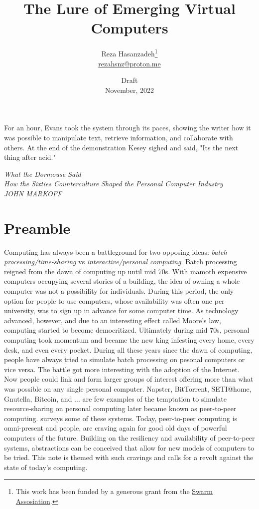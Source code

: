 \documentclass[a4paper, 10pt]{article}
\title{The Lure of Emerging Virtual Computers}
\author{Reza Hasanzadeh\thanks{This work has been funded by a generous grant from the \href{https://my.ethswarm.org/grants}{Swarm Assosiation}.}  \\ \href{mailto:rezahsnz@proton.me}{\small{rezahsnz@proton.me}}}
\date{\footnotesize{Draft} \\ \footnotesize{November, 2022}}
\begin{document}

\maketitle

\epigraph{For an hour, Evans took the system through its paces, showing the writer
how it was possible to manipulate text, retrieve information, and
collaborate with others. At the end of the demonstration Kesey sighed and
said, "Its the next thing after acid."}{\textit{What the Dormouse Said} \\ \textit{How the Sixties Counterculture Shaped the Personal Computer Industry} \\ \textit{JOHN MARKOFF}}

\section{Preamble}
Computing has always been a battleground for two opposing ideas: \textit{batch processing/time-sharing} vs \textit{interactive/personal computing}. Batch processing reigned from the dawn of computing up until mid 70s. With mamoth expensive computers occupying several stories of a building, the idea of owning a whole computer was not a possibility for individuals. During this period, the only option for people to use computers, whose availability was often one per university, was to sign up in advance for some computer time. As technology advanced, however, and due to an interesting effect called Moore's law, computing started to become democritized. Ultimately during mid 70s, personal computing took momentum and became the new king infesting every home, every desk, and even every pocket. During all these years since the dawn of computing, people have always tried to simulate batch processing on pesonal computers or vice versa. The battle got more interesting with the adoption of the Internet. Now people could link and form larger groups of interest offering more than what was possible on any single personal computer. Napster, BitTorrent, SETI@home, Gnutella, Bitcoin, and ... are few examples of the temptation to simulate resource-sharing on personal computing later became known as peer-to-peer computing. \cite{milo:2002} surveys some of these systems. Today, peer-to-peer computing is omni-present and people, are craving again for good old days of powerful computers of the future. Building on the resiliency and availability of peer-to-peer systems, abstractions can be conceived that allow for new models of computers to be tried. This note is themed with such cravings and calls for a revolt against the state of today's computing.
\end{document}
